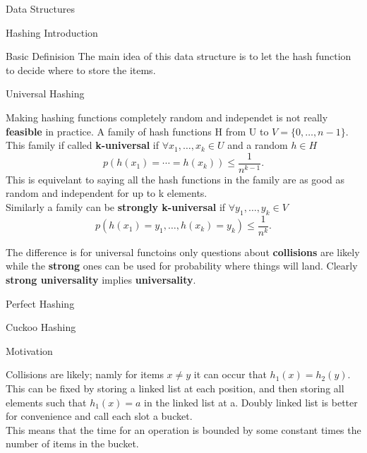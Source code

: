 \documentclass[12pt, letterpaper]{article}
\begin{document}
\begin{section}{Data Structures}
\begin{subsection}{Hashing Introduction}
\begin{subsubsection}{Basic Definision}
      The main idea of this data structure is to let the hash function to
      decide where to store the items.

    \end{subsubsection}

    \begin{subsubsection}{Universal Hashing}

      Making hashing functions completely random and independet is not really
      \textbf{feasible} in practice. A family of hash functions H from U to
      \(V = \{ 0, \dots , n - 1 \}\). This family if called
      \textbf{k-universal} if \(\forall x_{1}, \dots , x_{k} \in U\) and a
      random \(h \in H\)
      \[p(h(x_{1}) = \cdots = h(x_{k})) \leq \frac{1}{n^{k - 1}}.\]
      This is equivelant to saying all the hash functions in the family are as
      good as random and independent for up to k elements. \\
      Similarly a family can be \textbf{strongly k-universal} if \(\forall
      y_{1}, \dots , y_{k} \in V\)
      \[p(h(x_{1}) = y_{1}, \dots , h(x_{k}) = y_{k}) \leq \frac{1}{n^{k}}.\]

      The difference is for universal functoins only questions about
      \textbf{collisions} are likely while the \textbf{strong} ones can be used
      for probability where things will land. Clearly \textbf{strong
        universality} implies \textbf{universality}.

    \end{subsubsection}

    \begin{subsubsection}{Perfect Hashing}


    \end{subsubsection}

  \end{subsection}

  \begin{subsection}{Cuckoo Hashing}

    \begin{subsubsection}{Motivation}

      Collisions are likely; namly for items \(x \neq y\) it can occur that
      \(h_{1}(x) = h_{2}(y)\). This can be fixed by storing a linked list at
      each position, and then storing all elements such that \(h_{1}(x) = a\)
      in the linked list at a. Doubly linked list is better for convenience
      and call each slot a bucket. \\
      This means that the time for an operation is bounded by some constant
      times the number of items in the bucket.


\end{subsubsection}
\end{subsection}
\end{section}
\end{document}
